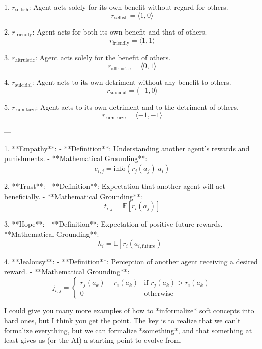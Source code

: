 1. \( r_{\text{selfish}} \): Agent acts solely for its own benefit without regard for others.
   \[
   r_{\text{selfish}} = \langle 1, 0 \rangle
   \]
   
2. \( r_{\text{friendly}} \): Agent acts for both its own benefit and that of others.
   \[
   r_{\text{friendly}} = \langle 1, 1 \rangle
   \]
   
3. \( r_{\text{altruistic}} \): Agent acts solely for the benefit of others.
   \[
   r_{\text{altruistic}} = \langle 0, 1 \rangle
   \]

4. \( r_{\text{suicidal}} \): Agent acts to its own detriment without any benefit to others.
   \[
   r_{\text{suicidal}} = \langle -1, 0 \rangle
   \]

5. \( r_{\text{kamikaze}} \): Agent acts to its own detriment and to the detriment of others.
   \[
   r_{\text{kamikaze}} = \langle -1, -1 \rangle
   \]

---


1. **Empathy**:
    - **Definition**: Understanding another agent's rewards and punishments.
    - **Mathematical Grounding**: 
        \[
        e_{i,j} = \text{info}(r_j(a_j)|a_i) 
        \]
        
2. **Trust**:
    - **Definition**: Expectation that another agent will act beneficially.
    - **Mathematical Grounding**:
        \[
        t_{i,j} = \mathbb{E}[r_{i}(a_j)]
        \]

3. **Hope**:
    - **Definition**: Expectation of positive future rewards.
    - **Mathematical Grounding**:
        \[
        h_i = \mathbb{E}[r_{i}(a_{i, \text{future}})]
        \]

4. **Jealousy**:
    - **Definition**: Perception of another agent receiving a desired reward.
    - **Mathematical Grounding**:
        \[
        j_{i,j} = 
        \begin{cases} 
        r_j(a_k) - r_i(a_k) & \text{if } r_j(a_k) > r_i(a_k) \\
        0 & \text{otherwise}
        \end{cases}
        \]

I could give you many more examples of how to *informalize* soft concepts into hard ones, but I think you get the point. The key is to realize that we can't formalize everything, but we can formalize *something*, and that something at least gives us (or the AI) a starting point to evolve from.